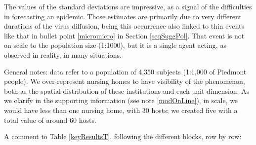 \documentclass[graybox]{svmult}
\begin{document}
The values of the standard deviations are impressive, as a signal of the difficulties in forecasting an epidemic. Those estimates are primarily due to very different durations of the virus diffusion, being this occurrence also linked to thin events like that in bullet point \ref{micromicro} in Section  \ref{seqSuggPol}. That event is not on scale to the population size (1:1000), but it is a single agent acting, as observed in reality, in many situations.

General notes: data refer to a population of 4,350 subjects (1:1,000 of Piedmont people). We over-represent nursing homes to have visibility of the phenomenon, both as the spatial distribution of these institutions and each unit dimension. As we clarify in the supporting information (see note \ref{modOnLine}), in scale, we would have less than one nursing home, with 30 hosts; we created five with a total value of around 60 hosts.

A comment to Table \ref{keyResultsT}, following the different blocks, row by row:
\end{document}
